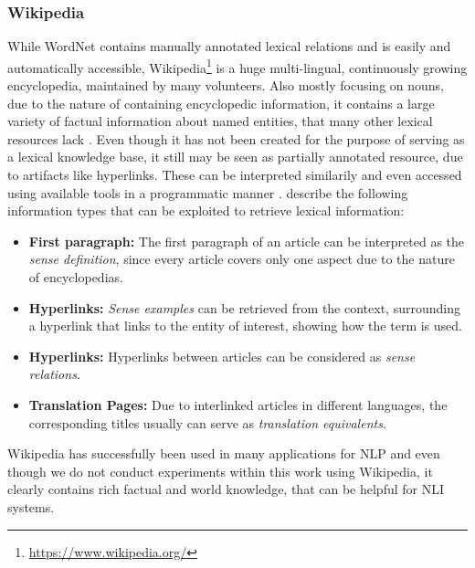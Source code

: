 \subsubsection{Wikipedia}\label{sec:wikipedia}
While WordNet contains manually annotated lexical relations and is easily and automatically accessible, Wikipedia\footnote{\href{https://www.wikipedia.org/}{https://www.wikipedia.org/}} is a huge multi-lingual, continuously growing  encyclopedia, maintained by many volunteers. Also mostly focusing on nouns, due to the nature of containing encyclopedic information, it contains a large variety of factual information about named entities, that many other lexical resources lack \citep{gurevych2016linked}. Even though it has not been created for the purpose of serving as a lexical knowledge base, it still may be seen as  partially annotated resource, due to artifacts like hyperlinks. These can be interpreted similarily and even accessed using available tools in a programmatic manner \citep{zesch2008extracting}.  \cite{gurevych2016linked} describe the following information types that can be exploited to retrieve lexical information:
\begin{itemize}
\item \textbf{First paragraph:} The first paragraph of an article can be interpreted as the \textit{sense definition}, since every article covers only one aspect due to the nature of encyclopedias.
\item \textbf{Hyperlinks:} \textit{Sense examples} can be retrieved from the context, surrounding a hyperlink that links to the entity of interest, showing how the term is used.
\item \textbf{Hyperlinks:} Hyperlinks between articles can be considered as \textit{sense relations}.
\item \textbf{Translation Pages:} Due to interlinked articles in different languages, the corresponding titles usually can serve as \textit{translation equivalents}.
\end{itemize}
Wikipedia has successfully been used in many applications for \ac{NLP} and even though we do not conduct experiments within this work using Wikipedia, it clearly contains rich factual and world knowledge, that can be helpful for \ac{NLI} systems. 
